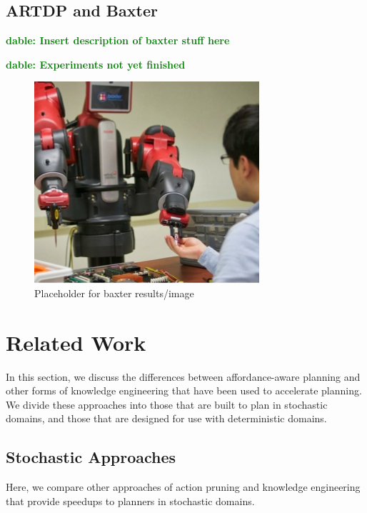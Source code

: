 \documentclass[letterpaper]{article}
\newcommand{\dnote}[1]{\textcolor{Green}{\textbf{dable:  #1}}}
\begin{document}
\subsection{ARTDP and Baxter}

\dnote{Insert description of baxter stuff here}

\dnote{Experiments not yet finished}

\begin{figure}[H]
\centering
\includegraphics[scale=0.195]{figures/baxter_temp.jpg}%
  \caption{Placeholder for baxter results/image}
  \label{fig:baxter_results}
\end{figure}

\section{Related Work}
\label{sec:related-work}

In this section, we discuss the differences between
affordance-aware planning and other forms of knowledge engineering that
have been used to accelerate planning. We divide these approaches
into those that are built to plan in stochastic domains, and those that are
designed for use with deterministic domains.

\subsection{Stochastic Approaches}

Here, we compare other approaches of action pruning and
knowledge engineering that provide speedups to planners
in stochastic domains.

\end{document}
